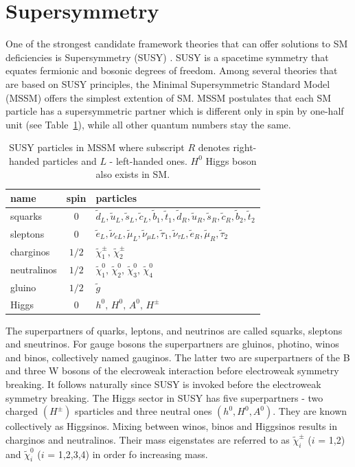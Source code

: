 \section{Supersymmetry}
One of the strongest candidate framework theories that can offer solutions to SM deficiencies is Supersymmetry (SUSY) \citep{Lykken:1996xt}. SUSY is a spacetime symmetry that equates fermionic and bosonic degrees of freedom. Among several theories that are based on SUSY principles, the Minimal Supersymmetric Standard Model (MSSM) offers the simplest extention of SM. MSSM postulates that each SM particle has a supersymmetric partner which is  different only in spin by one-half unit (see Table~\ref{tab:MSSMparticles}), while all other quantum numbers stay the same. 
\vspace{0.5cm}
\begin{table}
\captionsetup{width=0.8\textwidth}
\def\arraystretch{1.5}
\centering
\begin{tabular}{|l|c| l|}
\hline 
name & spin & particles \\ 
\hline 
squarks & 0 & $\tilde{d}_{L},\tilde{u}_{L},\tilde{s}_{L},\tilde{c}_{L}, \tilde{b}_{1}, \tilde{t}_{1}, \tilde{d}_R,\tilde{u}_{R},\tilde{s}_{R},\tilde{c}_{R},\tilde{b}_{2}, \tilde{t}_{2} $\\ 
sleptons & 0 & $\tilde{e}_L, \tilde{\nu}_{eL}, \tilde{\mu}_L, \tilde{\nu}_{\mu L}, \tilde{\tau}_1, \tilde{\nu}_{\tau L}, \tilde{e}_R,\tilde{\mu}_R, \tilde{\tau}_2 $\\ 
charginos & $1/2$ & $\tilde{\chi}_1^{\pm} ,\, \tilde{\chi}_2^{\pm}  $ \\ 
neutralinos & $1/2$ & $\tilde{\chi}_1^{0},\, \tilde{\chi}_2^{0},\,\tilde{\chi}_3^{0},\, \tilde{\chi}_4^{0} $\\ 
gluino & $1/2$ & $\tilde{g}$ \\  
Higgs & 0 & $h^{0},\, H^{0},\, A^{0},\, H^{\pm}$ \\ 
\hline 
\end{tabular} 
\caption{\label{tab:MSSMparticles} SUSY particles in MSSM where subscript $R$ denotes right-handed particles and $L$ - left-handed ones. $H^0$ Higgs boson also exists in SM. }
\end{table}
The superpartners of quarks, leptons, and neutrinos are called squarks, sleptons and sneutrinos. For gauge bosons the superpartners are  gluinos, photino, winos and binos, collectively named gauginos. The latter two are superpartners of the  B and three W bosons of the elecroweak interaction before electroweak symmetry breaking. It follows naturally since SUSY is invoked before the electroweak symmetry breaking. The Higgs sector in SUSY has five superpartners  - two charged $(H^{\pm})$ sparticles and three neutral ones $(h^0, H^0, A^0)$. They are known collectively as Higgsinos. Mixing between winos, binos and Higgsinos results in charginos and neutralinos. Their mass eigenstates are referred to as $\tilde{\chi}^{\pm}_{i}$ ($i$ = 1,2) and $\tilde{\chi}^{0}_{i}$ ($i$ = 1,2,3,4) in order fo increasing mass. 

